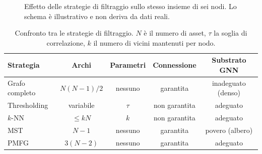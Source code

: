 \begin{figure}[H]
\centering
{}
\caption[Strategie di filtraggio del grafo di correlazione]{Effetto delle strategie di filtraggio sullo stesso insieme di sei nodi. Lo schema è illustrativo e non deriva da dati reali.}
\label{fig:graph-filtering}
\end{figure}

\begin{table}[H]
\centering
\caption[Confronto tra le strategie di costruzione del grafo]{Confronto tra le strategie di filtraggio. $N$ è il numero di asset, $\tau$ la soglia di correlazione, $k$ il numero di vicini mantenuti per nodo.}
\label{tab:graph-construction}
\small
\begin{tabular}{@{}lcccc@{}}
\toprule
\textbf{Strategia} & \textbf{Archi} & \textbf{Parametri} & \textbf{Connessione} & \textbf{Substrato GNN} \\
\midrule
Grafo completo & $N(N-1)/2$ & nessuno & garantita   & inadeguato (denso) \\
Thresholding   & variabile   & $\tau$   & non garantita & adeguato \\
$k$-NN         & $\leq kN$   & $k$      & non garantita & adeguato \\
MST            & $N-1$       & nessuno  & garantita   & povero (albero) \\
PMFG           & $3(N-2)$    & nessuno  & garantita   & adeguato \\
\bottomrule
\end{tabular}
\end{table}

